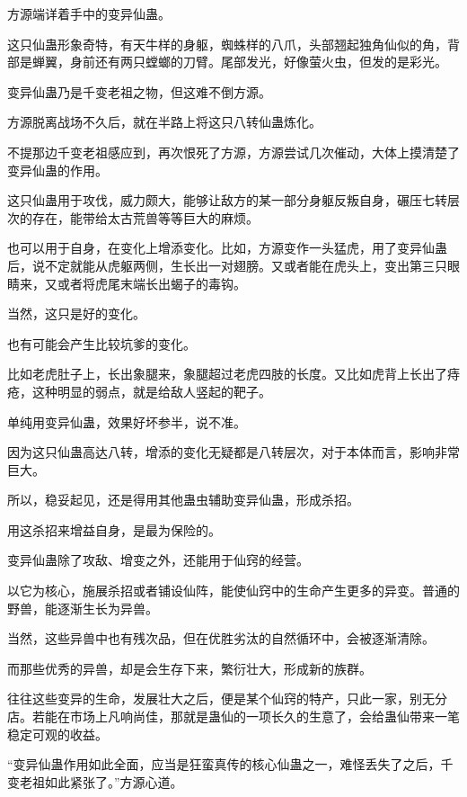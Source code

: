 
\begin{this_body}

方源端详着手中的变异仙蛊。

这只仙蛊形象奇特，有天牛样的身躯，蜘蛛样的八爪，头部翘起独角仙似的角，背部是蝉翼，身前还有两只螳螂的刀臂。尾部发光，好像萤火虫，但发的是彩光。

变异仙蛊乃是千变老祖之物，但这难不倒方源。

方源脱离战场不久后，就在半路上将这只八转仙蛊炼化。

不提那边千变老祖感应到，再次恨死了方源，方源尝试几次催动，大体上摸清楚了变异仙蛊的作用。

这只仙蛊用于攻伐，威力颇大，能够让敌方的某一部分身躯反叛自身，碾压七转层次的存在，能带给太古荒兽等等巨大的麻烦。

也可以用于自身，在变化上增添变化。比如，方源变作一头猛虎，用了变异仙蛊后，说不定就能从虎躯两侧，生长出一对翅膀。又或者能在虎头上，变出第三只眼睛来，又或者将虎尾末端长出蝎子的毒钩。

当然，这只是好的变化。

也有可能会产生比较坑爹的变化。

比如老虎肚子上，长出象腿来，象腿超过老虎四肢的长度。又比如虎背上长出了痔疮，这种明显的弱点，就是给敌人竖起的靶子。

单纯用变异仙蛊，效果好坏参半，说不准。

因为这只仙蛊高达八转，增添的变化无疑都是八转层次，对于本体而言，影响非常巨大。

所以，稳妥起见，还是得用其他蛊虫辅助变异仙蛊，形成杀招。

用这杀招来增益自身，是最为保险的。

变异仙蛊除了攻敌、增变之外，还能用于仙窍的经营。

以它为核心，施展杀招或者铺设仙阵，能使仙窍中的生命产生更多的异变。普通的野兽，能逐渐生长为异兽。

当然，这些异兽中也有残次品，但在优胜劣汰的自然循环中，会被逐渐清除。

而那些优秀的异兽，却是会生存下来，繁衍壮大，形成新的族群。

往往这些变异的生命，发展壮大之后，便是某个仙窍的特产，只此一家，别无分店。若能在市场上凡响尚佳，那就是蛊仙的一项长久的生意了，会给蛊仙带来一笔稳定可观的收益。

“变异仙蛊作用如此全面，应当是狂蛮真传的核心仙蛊之一，难怪丢失了之后，千变老祖如此紧张了。”方源心道。


\end{this_body}
